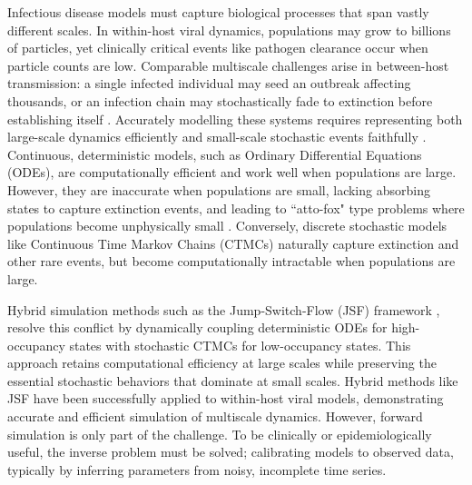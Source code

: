 \documentclass{article}
\begin{document}
Infectious disease models must capture biological processes that span vastly different scales. In within-host viral dynamics, populations may grow to billions of particles, yet clinically critical events like pathogen clearance occur when particle counts are low. Comparable multiscale challenges arise in between-host transmission: a single infected individual may seed an outbreak affecting thousands, or an infection chain may stochastically fade to extinction before establishing itself \cite{Anderson1991Infections, Perelson2002Modelling, Baccam2006Influenza}. Accurately modelling these systems requires representing both large-scale dynamics efficiently and small-scale stochastic events faithfully \cite{Isaacson2013, Flegg2014, Cotter2016}. Continuous, deterministic models, such as Ordinary Differential Equations (ODEs), are computationally efficient and work well when populations are large. However, they are inaccurate when populations are small,  lacking absorbing states to capture extinction events, and leading to ``atto-fox" type problems where populations become unphysically small \cite{Fowler2021Attofox, Mollison1991Attofox, Lobry2015Attofox}. Conversely, discrete stochastic models like Continuous Time Markov Chains (CTMCs) naturally capture extinction and other rare events, but become computationally intractable when populations are large.

Hybrid simulation methods such as the Jump-Switch-Flow (JSF) framework \cite{Germano2024JSF}, resolve this conflict by dynamically coupling deterministic ODEs for high-occupancy states with stochastic CTMCs for low-occupancy states. This approach retains computational efficiency at large scales while preserving the essential stochastic behaviors that dominate at small scales. Hybrid methods like JSF have been successfully applied to within-host viral models, demonstrating accurate and efficient simulation of multiscale dynamics.
However, forward simulation is only part of the challenge. To be clinically or epidemiologically useful, the inverse problem must be solved; calibrating models to observed data, typically by inferring parameters from noisy, incomplete time series. 
\end{document}
